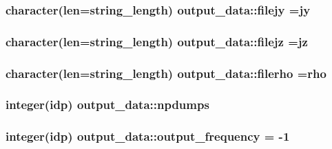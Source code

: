 \subsubsection[{\texorpdfstring{filejy}{filejy}}]{\setlength{\rightskip}{0pt plus 5cm}character(len=string\+\_\+length) output\+\_\+data\+::filejy =\textquotesingle{}jy\textquotesingle{}}\hypertarget{namespaceoutput__data_afaf1fb3c71c81a246f6af6ca881610ec}{}\label{namespaceoutput__data_afaf1fb3c71c81a246f6af6ca881610ec}
\subsubsection[{\texorpdfstring{filejz}{filejz}}]{\setlength{\rightskip}{0pt plus 5cm}character(len=string\+\_\+length) output\+\_\+data\+::filejz =\textquotesingle{}jz\textquotesingle{}}\hypertarget{namespaceoutput__data_a3656388605a302a6fc4c579fe82eb10b}{}\label{namespaceoutput__data_a3656388605a302a6fc4c579fe82eb10b}
\subsubsection[{\texorpdfstring{filerho}{filerho}}]{\setlength{\rightskip}{0pt plus 5cm}character(len=string\+\_\+length) output\+\_\+data\+::filerho =\textquotesingle{}rho\textquotesingle{}}\hypertarget{namespaceoutput__data_abd9468ccde074971628171196a7873f2}{}\label{namespaceoutput__data_abd9468ccde074971628171196a7873f2}
\subsubsection[{\texorpdfstring{npdumps}{npdumps}}]{\setlength{\rightskip}{0pt plus 5cm}integer(idp) output\+\_\+data\+::npdumps}\hypertarget{namespaceoutput__data_a4dbfde333a6a2225527c27d33472032e}{}\label{namespaceoutput__data_a4dbfde333a6a2225527c27d33472032e}
\subsubsection[{\texorpdfstring{output\+\_\+frequency}{output_frequency}}]{\setlength{\rightskip}{0pt plus 5cm}integer(idp) output\+\_\+data\+::output\+\_\+frequency = -\/1}\hypertarget{namespaceoutput__data_aa9299257a58dc37dd6c11e96a637459a}{}\label{namespaceoutput__data_aa9299257a58dc37dd6c11e96a637459a}
